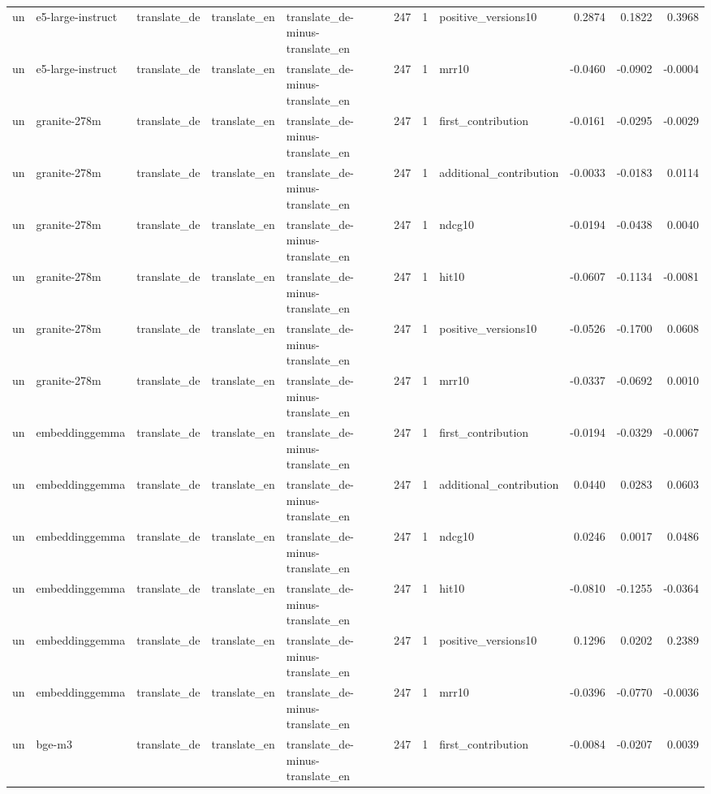 \begin{tabular}{lllllrrlrrr}
un & e5-large-instruct & translate\_de & translate\_en & translate\_de-minus-translate\_en & 247 & 1 & positive\_versions10 & 0.2874 & 0.1822 & 0.3968 \\
un & e5-large-instruct & translate\_de & translate\_en & translate\_de-minus-translate\_en & 247 & 1 & mrr10 & -0.0460 & -0.0902 & -0.0004 \\
un & granite-278m & translate\_de & translate\_en & translate\_de-minus-translate\_en & 247 & 1 & first\_contribution & -0.0161 & -0.0295 & -0.0029 \\
un & granite-278m & translate\_de & translate\_en & translate\_de-minus-translate\_en & 247 & 1 & additional\_contribution & -0.0033 & -0.0183 & 0.0114 \\
un & granite-278m & translate\_de & translate\_en & translate\_de-minus-translate\_en & 247 & 1 & ndcg10 & -0.0194 & -0.0438 & 0.0040 \\
un & granite-278m & translate\_de & translate\_en & translate\_de-minus-translate\_en & 247 & 1 & hit10 & -0.0607 & -0.1134 & -0.0081 \\
un & granite-278m & translate\_de & translate\_en & translate\_de-minus-translate\_en & 247 & 1 & positive\_versions10 & -0.0526 & -0.1700 & 0.0608 \\
un & granite-278m & translate\_de & translate\_en & translate\_de-minus-translate\_en & 247 & 1 & mrr10 & -0.0337 & -0.0692 & 0.0010 \\
un & embeddinggemma & translate\_de & translate\_en & translate\_de-minus-translate\_en & 247 & 1 & first\_contribution & -0.0194 & -0.0329 & -0.0067 \\
un & embeddinggemma & translate\_de & translate\_en & translate\_de-minus-translate\_en & 247 & 1 & additional\_contribution & 0.0440 & 0.0283 & 0.0603 \\
un & embeddinggemma & translate\_de & translate\_en & translate\_de-minus-translate\_en & 247 & 1 & ndcg10 & 0.0246 & 0.0017 & 0.0486 \\
un & embeddinggemma & translate\_de & translate\_en & translate\_de-minus-translate\_en & 247 & 1 & hit10 & -0.0810 & -0.1255 & -0.0364 \\
un & embeddinggemma & translate\_de & translate\_en & translate\_de-minus-translate\_en & 247 & 1 & positive\_versions10 & 0.1296 & 0.0202 & 0.2389 \\
un & embeddinggemma & translate\_de & translate\_en & translate\_de-minus-translate\_en & 247 & 1 & mrr10 & -0.0396 & -0.0770 & -0.0036 \\
un & bge-m3 & translate\_de & translate\_en & translate\_de-minus-translate\_en & 247 & 1 & first\_contribution & -0.0084 & -0.0207 & 0.0039 \\

\end{tabular}
